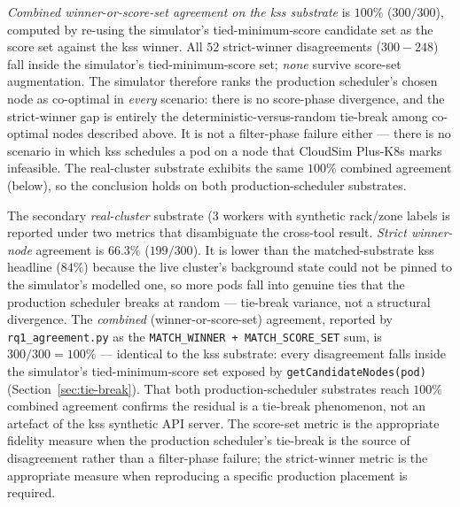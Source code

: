 \documentclass[ASNA,twocolumn]{USG}
\newcommand{\ckm}{CloudSim Plus-K8s\xspace}
\begin{document}
    \emph{Combined winner-or-score-set agreement on the kss substrate}
    is $100\%$ ($300/300$), computed by re-using the simulator's
    tied-minimum-score candidate set as the score set against the kss
    winner. All $52$ strict-winner disagreements ($300{-}248$) fall
    inside the simulator's tied-minimum-score set; \emph{none} survive
    score-set augmentation. The simulator therefore ranks the production
    scheduler's chosen node as co-optimal in \emph{every} scenario: there
    is no score-phase divergence, and the strict-winner gap is entirely
    the deterministic-versus-random tie-break among co-optimal nodes
    described above. It is not a filter-phase failure either --- there is
    no scenario in which kss schedules a pod on a node that \ckm marks
    infeasible. The real-cluster substrate exhibits the same $100\%$
    combined agreement (below), so the conclusion holds on both
    production-scheduler substrates.

    The secondary \emph{real-cluster} substrate (3 workers with synthetic
    rack/zone labels is reported under two
    metrics that disambiguate the cross-tool result. \emph{Strict winner-node}
    agreement is $66.3\%$ ($199/300$). It is lower than the
    matched-substrate kss headline ($84\%$) because the live cluster's
    background state could not be pinned to the simulator's modelled one,
    so more pods fall into genuine ties that the production scheduler
    breaks at random --- tie-break variance, not a structural divergence.
    The \emph{combined} (winner-or-score-set) agreement, reported by
    \texttt{rq1\_agreement.py} as the \texttt{MATCH\_WINNER + MATCH\_SCORE\_SET}
    sum, is $300/300 = 100\%$ --- identical to the kss substrate: every
    disagreement falls inside the simulator's tied-minimum-score set exposed
    by \texttt{getCandidateNodes(pod)} (Section~\ref{sec:tie-break}).
    That both production-scheduler substrates reach $100\%$ combined
    agreement confirms the residual is a tie-break phenomenon, not an
    artefact of the kss synthetic API server.
    The score-set metric is the appropriate fidelity measure when the
    production scheduler's tie-break is the source of disagreement rather
    than a filter-phase failure; the strict-winner metric is the
    appropriate measure when reproducing a specific production placement
    is required.
\end{document}
